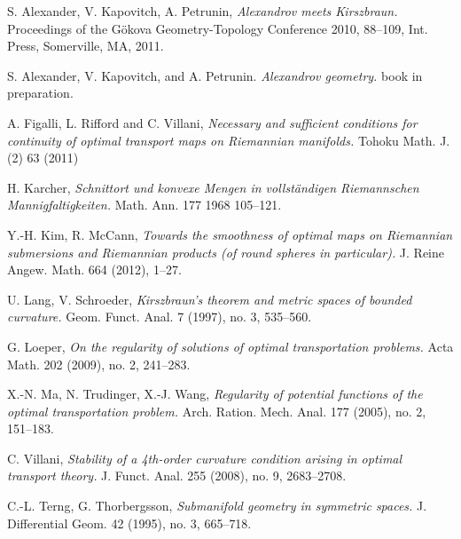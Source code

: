 \documentclass{article}
\begin{document}
\begin{thebibliography}{52}
 S. Alexander, V. Kapovitch, A. Petrunin, 
\emph{Alexandrov meets Kirszbraun.} 
Proceedings of the Gökova Geometry-Topology Conference 2010, 88--109, Int. Press, Somerville, MA, 2011.

 S. Alexander, V. Kapovitch, and A. Petrunin. \emph{Alexandrov geometry.} book in preparation.

 A. Figalli, L. Rifford and C. Villani,
\emph{Necessary and sufficient conditions for continuity of optimal transport maps on Riemannian manifolds.} Tohoku Math. J. (2) 63 (2011)

H. Karcher,
\emph{Schnittort und konvexe Mengen in vollständigen Riemannschen Mannigfaltigkeiten.}
Math. Ann. 177 1968 105--121.

 Y.-H. Kim, R. McCann,
\emph{Towards the smoothness of optimal maps on Riemannian submersions and Riemannian products (of round spheres in particular).}
J. Reine Angew. Math. 664 (2012), 1--27. 

 U. Lang, V. Schroeder,
\emph{Kirszbraun's theorem and metric spaces of bounded curvature.}
Geom. Funct. Anal. 7 (1997), no. 3, 535–560. 

G. Loeper, 
\emph{On the regularity of solutions of optimal transportation problems.}
Acta Math. 202 (2009), no. 2, 241–283. 

 X.-N. Ma, N. Trudinger,  X.-J. Wang, 
\emph{Regularity of potential functions of the optimal transportation problem.}
Arch. Ration. Mech. Anal. 177 (2005), no. 2, 151--183. 

 C. Villani, \emph{Stability of a 4th-order curvature condition arising in optimal transport theory.}
J. Funct. Anal. 255 (2008), no. 9, 2683--2708.


 C.-L. Terng, G. Thorbergsson,  
\emph{Submanifold geometry in symmetric spaces.} J. Differential Geom. 42 (1995), no. 3, 665--718.
 
\end{thebibliography}
\end{document}

